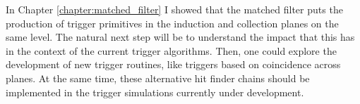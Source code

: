 \begin{comment}
The \gls{daq} system of the \gls{dune} far detector relies on the online identification of hits on channels, the so-called trigger primitives, to form decisions data to store. The goal of Chapter \ref{chapter:matched_filter} is to motivate a method to enhance the production of trigger primitives in the induction channels of the detectors. Forming trigger primitives from all the charge readout planes will improve the redundancy of the trigger algorithms. Not only that, but this may be the key to have more complex trigger logic that requires directional information. The aspect I focused on to improve the hit finding is the filtering of the waveforms. In section \ref{sec:matched_filter_fir} I use a sample of ProtoDUNE-SP cosmic data to show how different low-pass FIR filters affect the S/N in the collection and induction planes. Then, I introduce the concept of the matched filter in section \ref{sec:matched_filter_matched_filter}. Using the same dataset, I demonstrate that the improvement in the S/N of the induction channels achieved with these filters can be significantly higher than with the standard filter approach. A series of studies using MC samples are presented in section \ref{sec:matched_filter_mc_studies}. These allow to study the dependence of the filtering on the orientation and the energy of the tracks. I also use them to assess the impact of this method on the hit sensitivity. Finally, in section \ref{sec:matched_filter_vdcoldbox} I briefly summarise the results from the VD ColdBox runs which featured the matched filter.

With these studies, I showed that the matched filter puts the production of trigger primitives in the induction and collection planes on the same level. The natural next step will be to understand the impact that this has in the context of the current trigger algorithms. Then, explore the development of new trigger routines, like triggers based on coincidence across planes. At the same time, these alternative hit finder chains should be implemented in the trigger simulations currently under development.
\end{comment}

In Chapter \ref{chapter:matched_filter} I showed that the matched filter puts the production of trigger primitives in the induction and collection planes on the same level. The natural next step will be to understand the impact that this has in the context of the current trigger algorithms. Then, one could explore the development of new trigger routines, like triggers based on coincidence across planes. At the same time, these alternative hit finder chains should be implemented in the trigger simulations currently under development.

